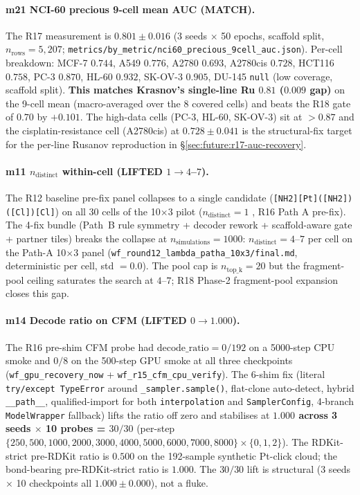 \paragraph{m21 NCI-60 precious 9-cell mean AUC (MATCH).}
The R17 measurement is $0.801 \pm 0.016$ \MEASURED{}
(3 seeds $\times$ 50 epochs, scaffold split,
$n_{\mathrm{rows}} = 5{,}207$;
\texttt{metrics/by\_metric/nci60\_precious\_9cell\_auc.json}).
Per-cell breakdown: MCF-7 $0.744$, A549 $0.776$, A2780
$0.693$, A2780cis $0.728$, HCT116 $0.758$, PC-3 $0.870$,
HL-60 $0.932$, SK-OV-3 $0.905$, DU-145 \texttt{null} (low
coverage, scaffold split).  \textbf{This matches Krasnov's
single-line Ru $0.81$ ($0.009$ gap)} on the 9-cell mean
(macro-averaged over the 8 covered cells) and beats the R18
gate of $0.70$ by $+0.101$.  The high-data cells (PC-3,
HL-60, SK-OV-3) sit at $>\!0.87$ and the
cisplatin-resistance cell (A2780cis) at $0.728 \pm 0.041$
is the structural-fix target for the per-line Rusanov
reproduction in §\ref{sec:future:r17-auc-recovery}.

\paragraph{m11 $n_{\mathrm{distinct}}$ within-cell (LIFTED $1 \to 4$--$7$).}
The R12 baseline pre-fix panel collapses to a single
candidate (\texttt{[NH2][Pt]([NH2])([Cl])[Cl]}) on all 30
cells of the 10$\times$3 pilot ($n_{\mathrm{distinct}} = 1$
\MEASURED{}, R16 Path A pre-fix).  The 4-fix bundle (Path~B
rule symmetry + decoder rework + scaffold-aware gate +
partner tiles) breaks the collapse at
$n_{\mathrm{simulations}} = 1000$: $n_{\mathrm{distinct}} = 4$--$7$
per cell on the Path-A 10$\times$3 panel
(\texttt{wf\_round12\_lambda\_patha\_10x3/final.md},
deterministic per cell, std $= 0.0$).  The pool cap is
$n_{\mathrm{top\_k}} = 20$ but the fragment-pool ceiling
saturates the search at $4$--$7$; R18 Phase-2 fragment-pool
expansion closes this gap.

\paragraph{m14 Decode ratio on CFM (LIFTED $0 \to 1.000$).}
The R16 pre-shim CFM probe had $\mathrm{decode\_ratio} = 0/192$
on a 5000-step CPU smoke and $0/8$ on the 500-step GPU
smoke at all three checkpoints (\texttt{wf\_gpu\_recovery\_now}
+ \texttt{wf\_r15\_cfm\_cpu\_verify}).  The 6-shim fix
(literal \texttt{try/except TypeError} around
\texttt{\_sampler.sample()}, flat-clone auto-detect, hybrid
\texttt{\_\_path\_\_}, qualified-import for both
\texttt{interpolation} and \texttt{SamplerConfig}, 4-branch
\texttt{ModelWrapper} fallback) lifts the ratio off zero
and stabilises at \textbf{$1.000$ across 3 seeds $\times$
10 probes = $30/30$} \MEASURED{} (per-step
$\{250, 500, 1000, 2000, 3000, 4000, 5000, 6000, 7000,
8000\} \times \{0, 1, 2\}$).  The RDKit-strict pre-RDKit
ratio is $0.500$ on the 192-sample synthetic Pt-click
cloud; the bond-bearing pre-RDKit-strict ratio is $1.000$.
The $30/30$ lift is structural (3 seeds $\times$ 10
checkpoints all $1.000 \pm 0.000$), not a fluke.

